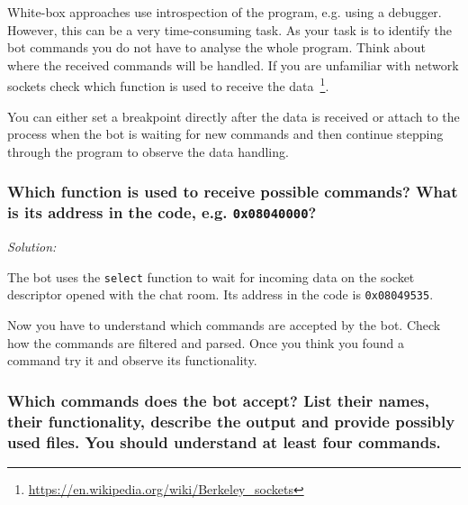\documentclass[a4paper,11pt]{article}
\newenvironment{solution}%
{\par{\noindent\small\textit{Solution:}}\vspace{-12pt}\begin{framed}}%
{\end{framed}\par}
\begin{document}
White-box approaches use introspection of the program, e.g. using a debugger.
However, this can be a very time-consuming task. As your task is to identify the
bot commands you do not have to analyse the whole program. Think about where the
received commands will be handled. If you are unfamiliar with network sockets
check which function is used to receive the
data~\footnote{\url{https://en.wikipedia.org/wiki/Berkeley_sockets}}.

You can either set a breakpoint directly after the data is received or attach to
the process when the bot is waiting for new commands and then continue stepping
through the program to observe the data handling.

\subsubsection*{Which function is used to receive possible commands? What is its
address in the code, e.g. \texttt{0x08040000}?}
\ifsolution
\begin{solution}
The bot uses the \texttt{select} function to wait for incoming data on the
socket descriptor opened with the chat room. Its address in the code is 
\texttt{0x08049535}.

\end{solution}\fi


Now you have to understand which commands are accepted by the bot. Check how the
commands are filtered and parsed. Once you think you found a command try it and
observe its functionality.

\subsubsection*{Which commands does the bot accept? List their names, their
functionality, describe the output and provide possibly used files. You should
understand at least four commands.}
\end{document}
